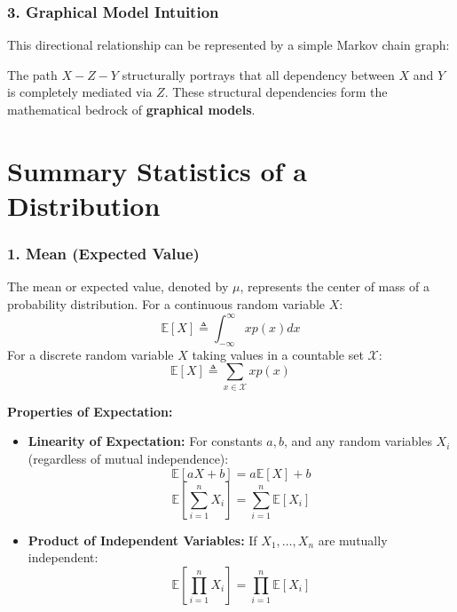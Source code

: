 \documentclass{article}
\begin{document}
\subsubsection*{3. Graphical Model Intuition}
This directional relationship can be represented by a simple Markov chain graph:
\begin{center}
\end{center}
The path $X - Z - Y$ structurally portrays that all dependency between $X$ and $Y$ is completely mediated via $Z$. These structural dependencies form the mathematical bedrock of \textbf{graphical models}.

\section*{Summary Statistics of a Distribution}

\subsubsection*{1. Mean (Expected Value)}
The mean or expected value, denoted by $\mu$, represents the center of mass of a probability distribution.
For a continuous random variable $X$:
\begin{equation}
    \mathbb{E}[X] \triangleq \int_{-\infty}^{\infty} x p(x) dx
\end{equation}
For a discrete random variable $X$ taking values in a countable set $\mathcal{X}$:
\begin{equation}
    \mathbb{E}[X] \triangleq \sum_{x \in \mathcal{X}} x p(x)
\end{equation}

\noindent \textbf{Properties of Expectation:}
\begin{itemize}
    \item \textbf{Linearity of Expectation:} For constants $a, b$, and any random variables $X_i$ (regardless of mutual independence):
    \begin{equation}
        \mathbb{E}[aX + b] = a\mathbb{E}[X] + b
    \end{equation}
    \begin{equation}
        \mathbb{E}\left[\sum_{i=1}^{n} X_i\right] = \sum_{i=1}^{n} \mathbb{E}[X_i]
    \end{equation}
    \item \textbf{Product of Independent Variables:} If $X_1, \dots, X_n$ are mutually independent:
    \begin{equation}
        \mathbb{E}\left[\prod_{i=1}^{n} X_i\right] = \prod_{i=1}^{n} \mathbb{E}[X_i]
    \end{equation}
\end{itemize}
\end{document}
